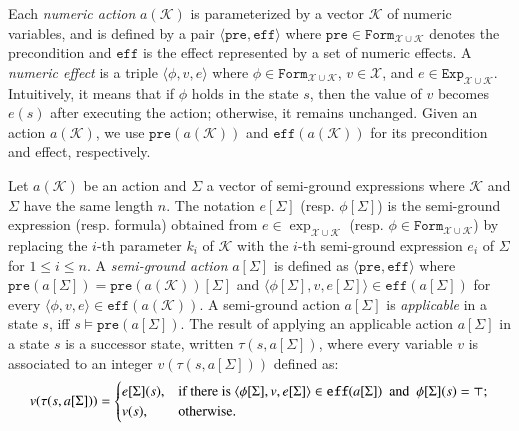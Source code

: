 \documentclass[review]{elsarticle}
\newcommand{\Exp}{\mathtt{Exp}}
\newcommand{\formula}{\mathtt{Form}}
\newcommand{\tuple}[1]{\langle {#1} \rangle}
\newcommand{\true}{\top}
\newcommand{\statevar}{\mathcal{X}}
\newcommand{\actparm}{\mathcal{K}}
\newcommand{\parmset}{\mathcal{K}}
\newcommand{\expVec}{\Sigma}
\newcommand{\pre}{\mathtt{pre}}
\newcommand{\eff}{\mathtt{eff}}
\newcommand{\con}{\phi}
\newcommand{\suc}{\tau}
\begin{document}
	Each \textit{numeric action} $a(\parmset)$ is parameterized by a vector $\parmset$ of numeric variables, and is defined by a pair $\tuple{\pre, \eff}$ where $\pre \in \formula_{\statevar \cup \parmset}$ denotes the precondition and $\eff$ is the effect represented by a set of numeric effects.
	A \textit{numeric effect} is a triple $\tuple{\con, v, e}$ where $\con \in \formula_{\statevar \cup \parmset}$, $v \in \statevar$, and $e \in \Exp_{\statevar \cup \parmset}$.
	Intuitively, it means that if $\con$ holds in the state $s$, then the value of $v$ becomes $e(s)$ after executing the action; otherwise, it remains unchanged.
	Given an action $a(\parmset)$, we use $\pre(a(\parmset))$ and $\eff(a(\parmset))$ for its precondition and effect, respectively.
	
	
	Let $a(\parmset)$ be an action and $\expVec$ a vector of semi-ground expressions where $\parmset$ and $\expVec$ have the same length $n$.
	The notation $e[\expVec]$ (resp. $\phi[\expVec]$) is the semi-ground expression (resp. formula) obtained from $e \in \exp_{\statevar \cup \parmset}$ (resp. $\phi \in \formula_{\statevar \cup \parmset}$) by replacing the $i$-th parameter $k_i$ of $\actparm$ with the $i$-th semi-ground expression $e_i$ of $\expVec$ for $1 \leq i \leq n$. 
	A \textit{semi-ground action} $a[\expVec]$ is defined as $\tuple{\pre, \eff}$ where $\pre(a[\expVec]) = \pre(a(\parmset))[\expVec]$ and $\tuple{\con[\expVec], v, e[\expVec]} \in \eff(a[\expVec])$ for every $\tuple{\con, v, e} \in \eff(a(\parmset))$.
	A semi-ground action $a[\expVec]$ is \textit{applicable} in a state $s$, iff $s \models \pre(a[\expVec])$.
	The result of applying an applicable action $a[\expVec]$ in a state $s$ is a successor state, written $\suc( s, a[\expVec])$, where every variable $v$ is associated to an integer $v(\suc(s, a[\expVec]))$ defined as:	
	\[v(\suc(s, a[\expVec])) =
	\begin{cases}
		e[\expVec](s), & \text{if there is } \tuple{\con[\expVec], v, e[\expVec]} \in \eff(a[\expVec])$ \text{ and } $\con[\expVec](s) = \true; \\
		v(s), & \text{otherwise. } 
	\end{cases}\]
	
\end{document}
